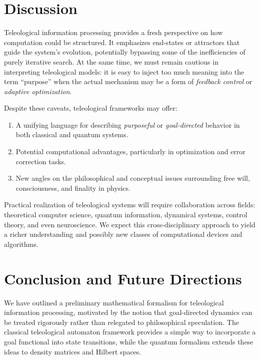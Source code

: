 \documentclass[12pt]{article}
\begin{document}
\section{Discussion}

Teleological information processing provides a fresh perspective on how computation could be structured. It emphasizes end-states or attractors that guide the system’s evolution, potentially bypassing some of the inefficiencies of purely iterative search. At the same time, we must remain cautious in interpreting teleological models: it is easy to inject too much meaning into the term ``purpose'' when the actual mechanism may be a form of \emph{feedback control} or \emph{adaptive optimization}.

Despite these caveats, teleological frameworks may offer:
\begin{enumerate}
    \item A unifying language for describing \emph{purposeful} or \emph{goal-directed} behavior in both classical and quantum systems.
    \item Potential computational advantages, particularly in optimization and error correction tasks.
    \item New angles on the philosophical and conceptual issues surrounding free will, consciousness, and finality in physics.
\end{enumerate}

Practical realization of teleological systems will require collaboration across fields: theoretical computer science, quantum information, dynamical systems, control theory, and even neuroscience. We expect this cross-disciplinary approach to yield a richer understanding and possibly new classes of computational devices and algorithms.

\section{Conclusion and Future Directions}

We have outlined a preliminary mathematical formalism for teleological information processing, motivated by the notion that goal-directed dynamics can be treated rigorously rather than relegated to philosophical speculation. The classical teleological automaton framework provides a simple way to incorporate a goal functional into state transitions, while the quantum formalism extends these ideas to density matrices and Hilbert spaces. 
\end{document}
